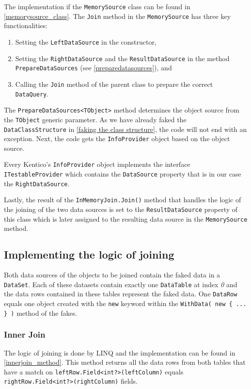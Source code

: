 \documentclass[
  print,
  table,
  nolof,
  nolot,
  nocover,
  oneside
]{fithesis3}
\begin{document}
The implementation if the \texttt{MemorySource} class can be found in \autoref{memorysource_class}. The \texttt{Join} method in the \texttt{MemorySource} has three key functionalities:
\begin{enumerate}
    \item Setting the \texttt{LeftDataSource} in the constructor,
    \item Setting the \texttt{RightDataSource} and the \texttt{ResultDataSource} in the method \texttt{PrepareDataSources} (see \autoref{preparedatasources}), and
    \item Calling the \texttt{Join} method of the parent class to prepare the correct \texttt{DataQuery}.
\end{enumerate}
   
The \texttt{PrepareDataSources<TObject>} method determines the object source from the \texttt{TObject} generic parameter. As we have already faked the \texttt{DataClassStructure} in \autoref{faking the class structure}, the code will not end with an exception. Next, the code gets the \texttt{InfoProvider} object based on the object source.

Every Kentico's \texttt{InfoProvider} object implements the interface \texttt{ITestableProvider} which contains the \texttt{DataSource} property that is in our case the \texttt{RightDataSource}.

Lastly, the result of the \texttt{InMemoryJoin.Join()} method that handles the logic of the joining of the two data sources is set to the \texttt{ResultDataSource} property of this class which is later assigned to the resulting data source in the \texttt{MemorySource} method.

\subsection{Implementing the logic of joining}
\label{logic of joining}

Both data sources of the objects to be joined contain the faked data in a \texttt{DataSet}. Each of these datasets contain exactly one \texttt{DataTable} at index \textit{0} and the data rows contained in these tables represent the faked data. One \texttt{DataRow} equals one object created with the \texttt{new} keyword within the \texttt{WithData( new \{ ... \} )} method of the fakes.

\subsubsection{Inner Join}
The logic of joining is done by LINQ and the implementation can be found in \autoref{innerjoin_method}. This method returns all the data rows from both tables that have a match on \texttt{leftRow.Field<int?>(leftColumn)} equals \texttt{rightRow.Field<int?>(rightColumn)} fields.
\end{document}
